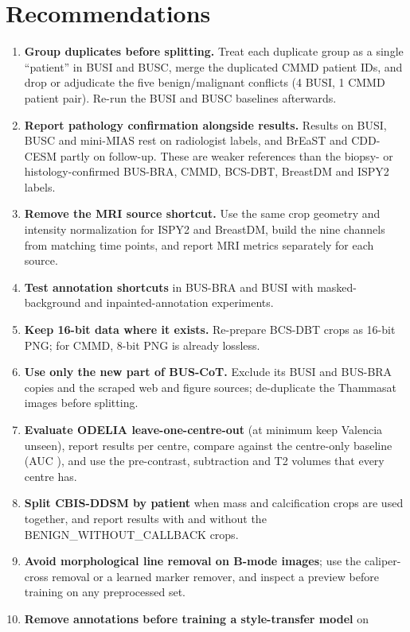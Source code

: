 \documentclass[11pt]{article}
\begin{document}
\section{Recommendations}
\label{sec:recommendations}

\begin{enumerate}
  \item \textbf{Group duplicates before splitting.} Treat each duplicate group
  as a single ``patient'' in BUSI and BUSC, merge the duplicated CMMD patient
  IDs, and drop or adjudicate the five benign/malignant conflicts (4 BUSI,
  1 CMMD patient pair). Re-run the BUSI and BUSC baselines afterwards.
  \item \textbf{Report pathology confirmation alongside results.} Results on
  BUSI, BUSC and mini-MIAS rest on radiologist labels, and BrEaST and CDD-CESM
  partly on follow-up. These are weaker references than the biopsy- or
  histology-confirmed BUS-BRA, CMMD, BCS-DBT, BreastDM and ISPY2 labels.
  \item \textbf{Remove the MRI source shortcut.} Use the same crop geometry
  and intensity normalization for ISPY2 and BreastDM, build the nine channels
  from matching time points, and report MRI metrics separately for each source.
  \item \textbf{Test annotation shortcuts} in BUS-BRA and BUSI with
  masked-background and inpainted-annotation experiments.
  \item \textbf{Keep 16-bit data where it exists.} Re-prepare BCS-DBT crops as
  16-bit PNG; for CMMD, 8-bit PNG is already lossless.
  \item \textbf{Use only the new part of BUS-CoT.} Exclude its BUSI and
  BUS-BRA copies and the scraped web and figure sources; de-duplicate the
  Thammasat images before splitting.
  \item \textbf{Evaluate ODELIA leave-one-centre-out} (at minimum keep
  Valencia unseen), report results per centre, compare against the
  centre-only baseline (AUC \odeliaCentreOnlyAUC), and use the pre-contrast,
  subtraction and T2 volumes that every centre has.
  \item \textbf{Split CBIS-DDSM by patient} when mass and calcification crops
  are used together, and report results with and without the
  BENIGN\_WITHOUT\_CALLBACK crops.
  \item \textbf{Avoid morphological line removal on B-mode images}; use the
  caliper-cross removal or a learned marker remover, and inspect a preview
  before training on any preprocessed set.
  \item \textbf{Remove annotations before training a style-transfer model} on

\end{enumerate}
\end{document}

